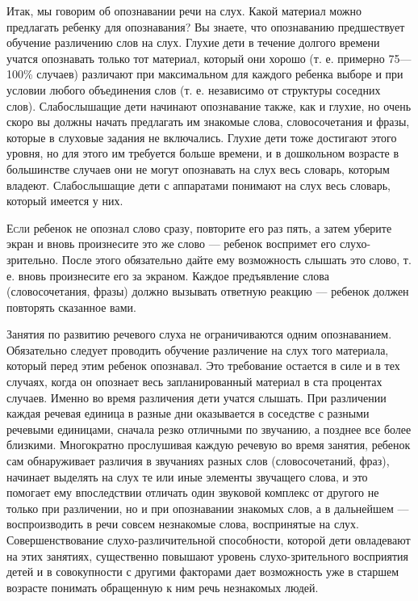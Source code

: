 \documentclass[a5paper]{book}
\begin{document}
Итак, мы говорим об опознавании речи на слух. Какой материал можно
предлагать ребенку для опознавания? Вы знаете, что опознаванию
предшествует обучение различению слов на слух. Глухие дети в течение
долгого времени учатся опознавать только тот материал, который они
хорошо (т. е. примерно 75---100\% случаев) различают при максимальном
для каждого ребенка выборе и при условии любого объединения слов (т. е.
независимо от структуры соседних слов). Слабослышащие дети начинают
опознавание также, как и глухие, но очень скоро вы должны начать
предлагать им знакомые слова, словосочетания и фразы, которые в слуховые
задания не включались. Глухие дети тоже достигают этого уровня, но для
этого им требуется больше времени, и в дошкольном возрасте в большинстве
случаев они не могут опознавать на слух весь словарь, которым владеют.
Слабослышащие дети с аппаратами понимают на слух весь словарь, который
имеется у них.

\textsc{Если} ребенок не опознал слово сразу, повторите его раз пять, а
затем уберите экран и вновь произнесите это же слово --- ребенок
воспримет его слухо-зрительно. После этого обязательно дайте ему
возможность слышать это слово, т. е. вновь произнесите его за экраном.
Каждое предъявление слова (словосочетания, фразы) должно вызывать
ответную реакцию --- ребенок должен повторять сказанное вами.

Занятия по развитию речевого слуха не ограничиваются одним опознаванием.
Обязательно следует проводить обучение различение на слух того
материала, который перед этим ребенок опознавал. Это требование остается
в силе и в тех случаях, когда он опознает весь запланированный материал
в ста процентах случаев. Именно во время различения дети учатся слышать.
При различении каждая речевая единица в разные дни оказывается в
соседстве с разными речевыми единицами, сначала резко отличными по
звучанию, а позднее все более близкими. Многократно прослушивая каждую
речевую во время занятия, ребенок сам обнаруживает различия в звучаниях
разных слов (словосочетаний, фраз), начинает выделять на слух те или
иные элементы звучащего слова, и это помогает ему впоследствии отличать
один звуковой комплекс от другого не только при различении, но и при
опознавании знакомых слов, а в дальнейшем --- воспроизводить в речи
совсем незнакомые слова, воспринятые на слух. Совершенствование
слухо-различительной способности, которой дети овладевают на этих
занятиях, существенно повышают уровень слухо-зрительного восприятия
детей и в совокупности с другими факторами дает возможность уже в
старшем возрасте понимать обращенную к ним речь незнакомых людей.
\end{document}
